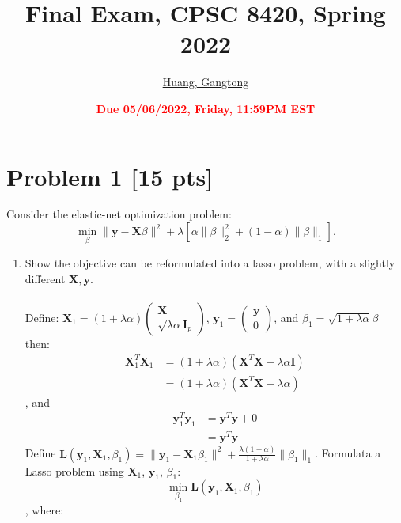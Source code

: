 \documentclass[11pt]{article}
\title{{\bf Final Exam, CPSC 8420, Spring 2022}}
\author{\Large\underline{Huang, Gangtong}}%
\date{\textbf{\Large\textcolor{red}{Due 05/06/2022, Friday, 11:59PM EST}}}
\newcommand{\mtx}[1]{\mathbf{#1}}
\newcommand{\vct}[1]{\mathbf{#1}}
\def \mI {\mtx{I}}
\def \mL {\mtx{L}}
\def \mX {\mtx{X}}
\def \vy {\vct{y}}
\begin{document}
\maketitle

\section*{Problem 1 [15 pts]}
Consider the elastic-net optimization problem:
\begin{equation}
\min_{\beta} \|\vy-\mX\beta\|^2+\lambda[\alpha\|\beta\|^2_2+(1-\alpha)\|\beta\|_1].
\end{equation}
\begin{enumerate}
	\item Show the objective can be reformulated into a lasso problem, with a slightly different $\mX, \vy$.\\ \\
	Define: 
	$
	\mX_1=
	(1+\lambda\alpha)\begin{pmatrix}
		\mX \\
		\sqrt{\lambda\alpha}\mI_p
	\end{pmatrix}
	$,  
	$
	\vy_1=\begin{pmatrix}
		\vy\\
		0
\end{pmatrix}
	$, and $\beta_1=\sqrt{1+\lambda\alpha}\beta$ then: 
	\begin{equation}
		\begin{aligned}
			\mX_1^T\mX_1&=(1+\lambda\alpha)(\mX^T\mX+\lambda\alpha\mI)\\
			&=(1+\lambda\alpha)(\mX^T\mX+\lambda\alpha)
		\end{aligned}
	\end{equation}, and
	\begin{equation}
		\begin{aligned}
			\vy_1^T\vy_1&=\vy^T\vy+0\\
			&=\vy^T\vy
		\end{aligned}
	\end{equation}
	Define $\mL(\vy_1,\mX_1,\beta_1)=\|\vy_1-\mX_1\beta_1\|^2 + \frac{\lambda(1-\alpha)}{1+\lambda\alpha}\|\beta_1\|_1$. Formulata a Lasso problem using $\mX_1$, $\vy_1$, $\beta_1$: 
	\begin{equation}
		\min_{\beta_1}\mL(\vy_1,\mX_1,\beta_1)
	\end{equation}, where:
	

\end{enumerate}
\end{document}
